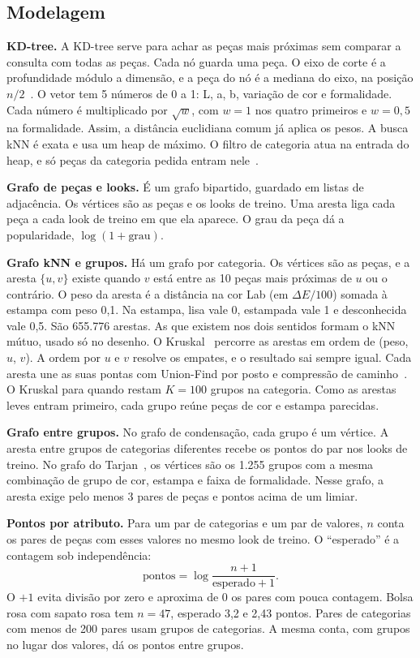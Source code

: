 \subsection{Modelagem}

\textbf{KD-tree.} A KD-tree serve para achar as peças mais próximas sem comparar a consulta com todas as peças. Cada nó guarda uma peça. O eixo de corte é a profundidade módulo a dimensão, e a peça do nó é a mediana do eixo, na posição $n/2$~\cite{bentley1975}. O vetor tem 5 números de 0 a 1: L, a, b, variação de cor e formalidade. Cada número é multiplicado por $\sqrt{w}$, com $w = 1$ nos quatro primeiros e $w = 0{,}5$ na formalidade. Assim, a distância euclidiana comum já aplica os pesos. A busca kNN é exata e usa um heap de máximo. O filtro de categoria atua na entrada do heap, e só peças da categoria pedida entram nele~\cite{friedman1977}.

\textbf{Grafo de peças e looks.} É um grafo bipartido, guardado em listas de adjacência. Os vértices são as peças e os looks de treino. Uma aresta liga cada peça a cada look de treino em que ela aparece. O grau da peça dá a popularidade, $\log(1 + \text{grau})$.

\textbf{Grafo kNN e grupos.} Há um grafo por categoria. Os vértices são as peças, e a aresta $\{u, v\}$ existe quando $v$ está entre as 10 peças mais próximas de $u$ ou o contrário. O peso da aresta é a distância na cor Lab (em $\Delta E/100$) somada à estampa com peso 0,1. Na estampa, lisa vale 0, estampada vale 1 e desconhecida vale 0,5. São 655.776 arestas. As que existem nos dois sentidos formam o kNN mútuo, usado só no desenho. O Kruskal~\cite{kruskal1956} percorre as arestas em ordem de (peso, $u$, $v$). A ordem por $u$ e $v$ resolve os empates, e o resultado sai sempre igual. Cada aresta une as suas pontas com Union-Find por posto e compressão de caminho~\cite{galler1964,tarjan1975}. O Kruskal para quando restam $K = 100$ grupos na categoria. Como as arestas leves entram primeiro, cada grupo reúne peças de cor e estampa parecidas.

\textbf{Grafo entre grupos.} No grafo de condensação, cada grupo é um vértice. A aresta entre grupos de categorias diferentes recebe os pontos do par nos looks de treino. No grafo do Tarjan~\cite{tarjan1972}, os vértices são os 1.255 grupos com a mesma combinação de grupo de cor, estampa e faixa de formalidade. Nesse grafo, a aresta exige pelo menos 3 pares de peças e pontos acima de um limiar.

\textbf{Pontos por atributo.} Para um par de categorias e um par de valores, $n$ conta os pares de peças com esses valores no mesmo look de treino. O ``esperado'' é a contagem sob independência:
\begin{equation}
\text{pontos} = \log\frac{n + 1}{\text{esperado} + 1}.
\end{equation}
O $+1$ evita divisão por zero e aproxima de 0 os pares com pouca contagem. Bolsa rosa com sapato rosa tem $n = 47$, esperado 3,2 e 2,43 pontos. Pares de categorias com menos de 200 pares usam grupos de categorias. A mesma conta, com grupos no lugar dos valores, dá os pontos entre grupos.

